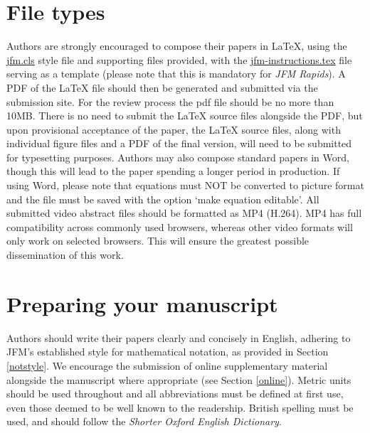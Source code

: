 \documentclass[lineno]{jfm}
\begin{document}
\section{File types}\label{sec:filetypes}
 Authors are strongly encouraged to compose their papers in {\LaTeX}, using the \href{https://www.cambridge.org/core/journals/journal-of-fluid-mechanics/information/instructions-contributors} {jfm.cls} style file and supporting files provided, with the \href{https://www.cambridge.org/core/journals/journal-of-fluid-mechanics/information/instructions-contributors} {jfm-instructions.tex} file serving as a template (please note that this is mandatory for {\it JFM Rapids}). A PDF of the {\LaTeX} file should then be generated and submitted via the submission site. For the review process the pdf file should be no more than 10MB. There is no need to submit the {\LaTeX} source files alongside the PDF, but upon provisional acceptance of the paper, the {\LaTeX} source files, along with individual figure files and a PDF of the final version, will need to be submitted for typesetting purposes.
Authors may also compose standard papers in Word, though this will lead to the paper spending a longer period in production. If using Word, please note that equations must NOT be converted to picture format and the file must be saved with the option `make equation editable'. All submitted video abstract files should be formatted as MP4 (H.264). MP4 has full compatibility across commonly used browsers, whereas other video formats will only work on selected browsers. This will ensure the greatest possible dissemination of this work.
\section{Preparing your manuscript}
 Authors should write their papers clearly and concisely in English, adhering to JFM's established style for mathematical notation, as provided in Section \ref{notstyle}. We encourage the submission of online supplementary material alongside the manuscript where appropriate (see Section \ref{online}). Metric units should be used throughout and all abbreviations must be defined at first use, even those deemed to be well known to the readership. British spelling must be used, and should follow the \textit{Shorter Oxford English Dictionary}.
\end{document}
